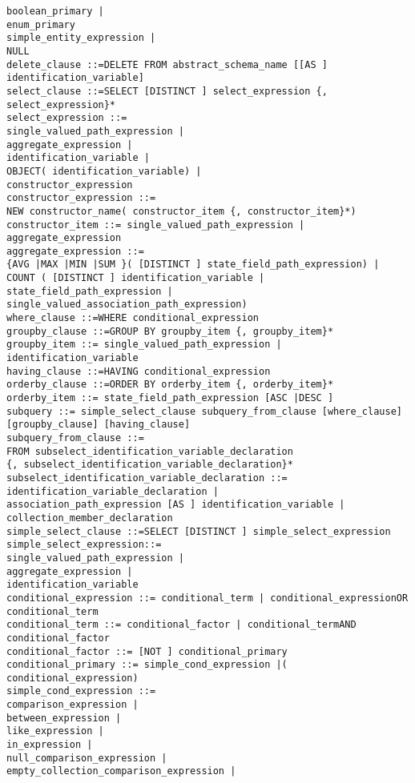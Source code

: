 \documentclass[11pt,a4paper]{report}
\begin{document}
\begin{verbatim}
boolean_primary |
enum_primary
simple_entity_expression |
NULL
delete_clause ::=DELETE FROM abstract_schema_name [[AS ] identification_variable]
select_clause ::=SELECT [DISTINCT ] select_expression {, select_expression}*
select_expression ::=
single_valued_path_expression |
aggregate_expression |
identification_variable |
OBJECT( identification_variable) |
constructor_expression
constructor_expression ::=
NEW constructor_name( constructor_item {, constructor_item}*)
constructor_item ::= single_valued_path_expression | aggregate_expression
aggregate_expression ::=
{AVG |MAX |MIN |SUM }( [DISTINCT ] state_field_path_expression) |
COUNT ( [DISTINCT ] identification_variable | state_field_path_expression |
single_valued_association_path_expression)
where_clause ::=WHERE conditional_expression
groupby_clause ::=GROUP BY groupby_item {, groupby_item}*
groupby_item ::= single_valued_path_expression | identification_variable
having_clause ::=HAVING conditional_expression
orderby_clause ::=ORDER BY orderby_item {, orderby_item}*
orderby_item ::= state_field_path_expression [ASC |DESC ]
subquery ::= simple_select_clause subquery_from_clause [where_clause]
[groupby_clause] [having_clause]
subquery_from_clause ::=
FROM subselect_identification_variable_declaration
{, subselect_identification_variable_declaration}*
subselect_identification_variable_declaration ::=
identification_variable_declaration |
association_path_expression [AS ] identification_variable |
collection_member_declaration
simple_select_clause ::=SELECT [DISTINCT ] simple_select_expression
simple_select_expression::=
single_valued_path_expression |
aggregate_expression |
identification_variable
conditional_expression ::= conditional_term | conditional_expressionOR conditional_term
conditional_term ::= conditional_factor | conditional_termAND conditional_factor
conditional_factor ::= [NOT ] conditional_primary
conditional_primary ::= simple_cond_expression |( conditional_expression)
simple_cond_expression ::=
comparison_expression |
between_expression |
like_expression |
in_expression |
null_comparison_expression |
empty_collection_comparison_expression |


\end{verbatim}
\end{document}
